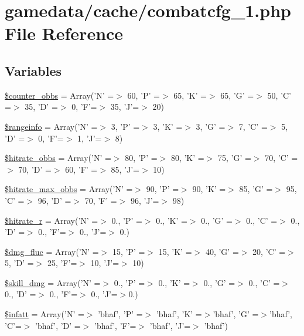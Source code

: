 \hypertarget{combatcfg__1_8php}{\section{gamedata/cache/combatcfg\+\_\+1.php File Reference}
\label{combatcfg__1_8php}
}
\subsection*{Variables}
\begin{DoxyCompactItemize}
\item 
\hyperlink{combatcfg__1_8php_a81eebe5aca6408cce5219624c52f7f86}{\$counter\+\_\+obbs} = Array('N' =$>$ 60, 'P' =$>$ 65, 'K' =$>$ 65, 'G' =$>$ 50, 'C' =$>$ 35, 'D' =$>$ 0, 'F'=$>$ 35, 'J'=$>$ 20)
\item 
\hyperlink{combatcfg__1_8php_a8c21a6a396577f4f203cd5a67dd4ad5b}{\$rangeinfo} = Array('N' =$>$ 3, 'P' =$>$ 3, 'K' =$>$ 3, 'G' =$>$ 7, 'C' =$>$ 5, 'D' =$>$ 0, 'F'=$>$ 1, 'J'=$>$ 8)
\item 
\hyperlink{combatcfg__1_8php_ac675dd97339f167860b7465a8af386bd}{\$hitrate\+\_\+obbs} = Array('N' =$>$ 80, 'P' =$>$ 80, 'K' =$>$ 75, 'G' =$>$ 70, 'C' =$>$ 70, 'D' =$>$ 60, 'F' =$>$ 85, 'J'=$>$ 10)
\item 
\hyperlink{combatcfg__1_8php_a6d9d26fbeeefc20aa46ea345bcb5ed51}{\$hitrate\+\_\+max\+\_\+obbs} = Array('N' =$>$ 90, 'P' =$>$ 90, 'K' =$>$ 85, 'G' =$>$ 95, 'C' =$>$ 96, 'D' =$>$ 70, 'F' =$>$ 96, 'J'=$>$ 98)
\item 
\hyperlink{combatcfg__1_8php_a456845a4c14b252134d57fd130706f9d}{\$hitrate\+\_\+r} = Array('N' =$>$ 0., 'P' =$>$ 0., 'K' =$>$ 0., 'G' =$>$ 0., 'C' =$>$ 0., 'D' =$>$ 0., 'F'=$>$ 0., 'J'=$>$ 0.)
\item 
\hyperlink{combatcfg__1_8php_ac91da8ed2c61fc98debd39a8dcf2614f}{\$dmg\+\_\+fluc} = Array('N' =$>$ 15, 'P' =$>$ 15, 'K' =$>$ 40, 'G' =$>$ 20, 'C' =$>$ 5, 'D' =$>$ 25, 'F'=$>$ 10, 'J'=$>$ 10)
\item 
\hyperlink{combatcfg__1_8php_a73b7c90b0a42c3922eaeb5c2a4ffa88c}{\$skill\+\_\+dmg} = Array('N' =$>$ 0., 'P' =$>$ 0., 'K' =$>$ 0., 'G' =$>$ 0., 'C' =$>$ 0., 'D' =$>$ 0., 'F'=$>$ 0., 'J'=$>$0.)
\item 
\hyperlink{combatcfg__1_8php_a64a1cbe5826ab0a52fbad2eb81f37960}{\$infatt} = Array('N' =$>$ 'bhaf', 'P' =$>$ 'bhaf', 'K' =$>$'bhaf', 'G' =$>$'bhaf', 'C'=$>$ 'bhaf', 'D' =$>$ 'bhaf', 'F'=$>$ 'bhaf', 'J'=$>$ 'bhaf')

\end{DoxyCompactItemize}
